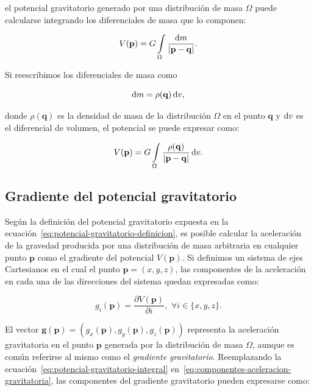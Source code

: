 \noindent el potencial gravitatorio generado por una distribución de masa
$\Omega$ puede calcularse integrando los diferenciales de masa que lo componen:

\begin{equation}
    V(\mathbf{p}) =
        G \int\limits_\Omega \frac{\mathop{}\!\textnormal{d} m}{|\mathbf{p} - \mathbf{q}|} .
\end{equation}

Si reescribimos los diferenciales de masa como

\begin{equation}
    \mathop{}\!\textnormal{d} m = \rho(\mathbf{q}) \mathop{}\!\textnormal{d} v,
\end{equation}

\noindent donde $\rho(\mathbf{q})$ es la densidad de masa de la distribución
$\Omega$ en el punto $\mathbf{q}$ y $\mathop{}\!\textnormal{d} v$ es el diferencial de volumen,
el potencial se puede expresar como:

\begin{equation}
    V(\mathbf{p}) =
        G \int\limits_\Omega
        \frac{\rho(\mathbf{q})}{|\mathbf{p} - \mathbf{q}|} \mathop{}\!\textnormal{d} v.
    \label{eq:potencial-gravitatorio-integral}
\end{equation}


\subsection{Gradiente del potencial gravitatorio}

Según la definición del potencial gravitatorio expuesta en la
ecuación~\ref{eq:potencial-gravitatorio-definicion}, es posible calcular la
aceleración de la gravedad producida por una distribución de masa arbitraria
en cualquier punto $\mathbf{p}$ como el gradiente del potencial
$V(\mathbf{p})$.
Si definimos un sistema de ejes Cartesianos en el cual el punto $\mathbf{p}
= (x, y, z)$, las componentes de la aceleración en cada una de las direcciones
del sistema quedan expresadas
como:

\begin{equation}
    g_i(\mathbf{p}) = \frac{\partial V(\mathbf{p})}{\partial i}, \,\,
        \forall i \in \{x, y, z\}.
    \label{eq:componentes-aceleracion-gravitatoria}
\end{equation}

El vector
$\mathbf{g}(\mathbf{p}) = (g_x(\mathbf{p}), g_y(\mathbf{p}), g_z(\mathbf{p}))$
representa la aceleración gravitatoria en el punto
$\mathbf{p}$ generada por la distribución de masa $\Omega$, aunque es común
referirse al mismo como el \emph{gradiente gravitatorio}.
Reemplazando la ecuación~\ref{eq:potencial-gravitatorio-integral}
en~\ref{eq:componentes-aceleracion-gravitatoria}, las componentes del gradiente
gravitatorio pueden expresarse como:

